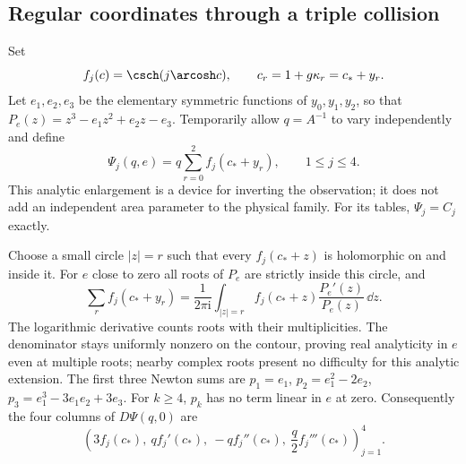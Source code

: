\subsection{Regular coordinates through a triple collision}
Set
\[
 f_j(c)=\csch(j\arcosh c),\qquad c_r=1+g\kappa_r=c_*+y_r.
\]
Let $e_1,e_2,e_3$ be the elementary symmetric functions of
$y_0,y_1,y_2$, so that
$P_e(z)=z^3-e_1z^2+e_2z-e_3$. Temporarily allow $q=A^{-1}$ to vary
independently and define
\begin{equation}\label{eq:v5-amplitude-map}
 \Psi_j(q,e)=q\sum_{r=0}^2 f_j(c_*+y_r),\qquad 1\le j\le4.
\end{equation}
This analytic enlargement is a device for inverting the observation;
it does not add an independent area parameter to the physical family.
For its tables, $\Psi_j=C_j$ exactly.

Choose a small circle $|z|=r$ such that every $f_j(c_*+z)$ is
holomorphic on and inside it. For $e$ close to zero all roots of $P_e$
are strictly inside this circle, and
\begin{equation}\label{eq:v5-contour-symmetry}
 \sum_r f_j(c_*+y_r)=\frac{1}{2\pi\mathrm i}
       \int_{|z|=r} f_j(c_*+z)\frac{P_e'(z)}{P_e(z)}\,\dd z.
\end{equation}
The logarithmic derivative counts roots with their multiplicities.
The denominator stays uniformly nonzero on the contour, proving real
analyticity in $e$ even at multiple roots; nearby complex roots present
no difficulty for this analytic extension.
The first three Newton sums are
$p_1=e_1$, $p_2=e_1^2-2e_2$,
$p_3=e_1^3-3e_1e_2+3e_3$.
For $k\ge4$, $p_k$ has no term linear in $e$ at zero.
Consequently the four columns of $D\Psi(q,0)$ are
\begin{equation}\label{eq:v5-jacobian-columns}
 \left(3f_j(c_*),\ q f_j'(c_*),\ -q f_j''(c_*),\
                     \frac q2 f_j'''(c_*)\right)_{j=1}^4.
\end{equation}

